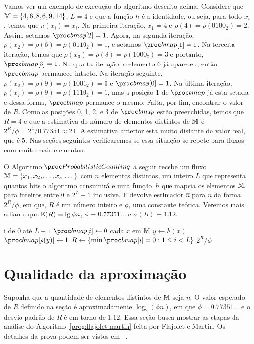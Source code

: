 Vamos ver um exemplo de execução do algoritmo descrito acima. Considere que $\mathbb{M} = \{ 4, 6, 8, 6, 9, 14 \}$, $L = 4$ e
que a função $h$ é a identidade, ou seja, para todo $x_i$, temos que $h(x_i) = x_i$. Na primeira iteração, $x_1 = 4$ e 
$\rho(4) = \rho(0100_2) = 2$. Assim, setamos $\bitmap[2] = 1$. Agora, na segunda iteração, 
$\rho(x_2) = \rho(6) = \rho(0110_2) = 1$, e setamos $\bitmap[1] = 1$. Na terceita iteração, temos que 
$\rho(x_3) = \rho(8) = \rho(1000_2) = 3$ e portanto, $\bitmap[3] = 1$. Na quarta iteração, o elemento $6$ já apareceu, 
então $\bitmap$ permanece intacto. Na iteração seguinte, $\rho(x_6) = \rho(9) = \rho(1001_2) = 0$ e $\bitmap[0] = 1$.
Na última iteração, $\rho(x_7) = \rho(9) = \rho(1110_2) = 1$, mas a posição 1 de $\bitmap$ já esta setada e dessa forma,
$\bitmap$ permance o mesmo. Falta, por fim, encontrar o valor de $R$. Como as posições 0, 1, 2, e 3 de $\bitmap$ estão
preenchidas, temos que $R = 4$ e que a estimativa do número de elementos distintos de $\mathbb{M}$ é 
$2^{R}/\phi = 2^4/0.77351 \approx 21$. A estimativa anterior está muito distante do valor real, que é $5$. Nas seções
seguintes verificaremos se essa situação se repete para fluxos com muito mais elementos.

O Algoritmo $\pc$ a seguir recebe um fluxo $\mathbb{M} = \{ x_1, x_2, \dots, x_s, \dots \}$ com $n$ elementos distintos, 
um inteiro $L$ que representa quantos bits o algoritmo consumirá e uma função~$h$ que mapeia os elementos $\mathbb{M}$ para 
inteiros entre $0$ e $2^L - 1$ inclusive. E devolve estimador $\hat{n}$ para $n$ da forma $2^{R}/\phi$, em que, $R$ é um
número inteiro e $\phi$, uma constante teórica. Veremos mais adiante que $\mathbb{E}(R) = \lg \phi n$, $\phi = 0.77351\dots$ e
$\sigma(R) = 1.12$.

\begin{codebox}
  \li \For i de $0$ até $L + 1$
      \Do
  \li    $\bitmap[i] \gets 0$
      \End
  \li \For cada $x$ em $\mathbb{M}$
      \Do
  \li   $y \gets h(x)$
  \li   $\bitmap[\rho(y)] \gets 1$
      \End
  \li $R \gets \{ \min \bitmap[i] = 0: 1 \leq i < L \}$
  \li\Return $2^R/\phi$
  \End
\end{codebox}

\newpage
\section{Qualidade da aproximação}
\label{sec:flajolet-martin:analysis}

Suponha que a quantidade de elementos distintos de $\mathbb{M}$ seja $n$. O valor esperado de $R$ definido na seção 
 é aproximadamente $\log_2(\phi n)$, em que $\phi = 0.77351\dots$ e o desvio padrão 
de $R$ é em torno de $1.12$. Essa seção busca mostrar as etapas da análise do Algoritmo~\ref{prog:flajolet-martin} feita 
por Flajolet e Martin. Os detalhes da prova podem ser vistos em ~\citep{flajolet:martin:85}.

